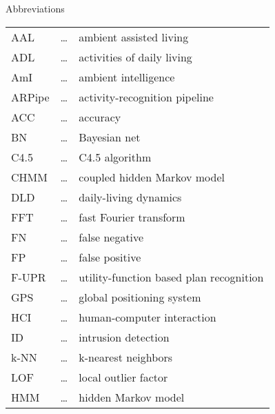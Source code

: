 
\begin{preliminary}{Abbreviations}



\begin{tabular}{lcl}

AAL			& \dots & ambient assisted living \\

ADL			& \dots & activities of daily living \\

AmI			& \dots & ambient intelligence \\

ARPipe		& \dots & activity-recognition pipeline \\

ACC			& \dots &	accuracy \\

BN			& \dots & Bayesian net \\

C4.5			& \dots & C4.5 algorithm \\

CHMM		& \dots & coupled hidden Markov model \\

DLD			& \dots & daily-living dynamics \\

FFT			& \dots &	fast Fourier transform \\

FN			& \dots &	false negative \\

FP		 	& \dots &	false positive \\

F-UPR		& \dots & utility-function based plan recognition \\

GPS		 	& \dots &	global positioning system \\

HCI			& \dots &	human-computer interaction\\

ID			& \dots &	intrusion detection\\

k-NN			& \dots & k-nearest neighbors \\

LOF			& \dots & local outlier factor \\

HMM			& \dots &	hidden Markov model\\


\end{tabular}
\end{preliminary}
